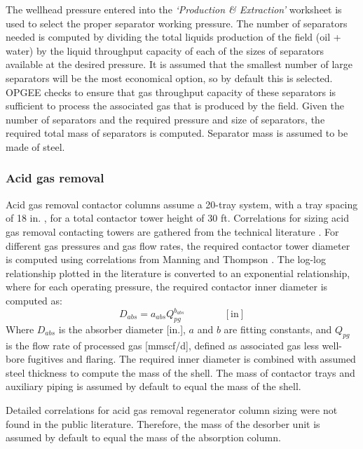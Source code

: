 \documentclass[11pt]{report}
\newcommand{\sheet}[1]{\textit{`{#1}'}}
\newcommand{\eqnunit}[1]{\quad\quad \scriptstyle{\left[\text{#1}\right]}}
\begin{document}
The wellhead pressure entered into the \sheet{Production \& Extraction} worksheet  is used to select the proper separator working pressure. The number of separators needed is computed by dividing the total liquids production of the field (oil + water) by the liquid throughput capacity of each of the sizes of separators available at the desired pressure.  It is assumed that the smallest number of large separators will be the most economical option, so by default this is selected. OPGEE checks to ensure that gas throughput capacity of these separators is sufficient to process the associated gas that is produced by the field.  Given the number of separators and the required pressure and size of separators, the required total mass of separators is computed. Separator mass is assumed to be made of steel.

\subsubsection{Acid gas removal}

Acid gas  removal contactor columns assume a 20-tray system, with a tray spacing of 18 in. \cite[p.116]{Manning1991}, for a total contactor tower height of 30 ft. Correlations for sizing acid gas removal contacting towers are gathered from the technical literature \cite{Manning1991}. For different gas pressures and gas flow rates, the required contactor tower diameter is  computed using correlations from Manning and Thompson \cite{Manning1991}. The log-log relationship plotted in the literature is converted to an exponential relationship, where for each operating pressure, the required contactor inner diameter is computed as:
\begin{equation}
D_{abs} = a_{abs} Q_{pg}^{b_{abs}} \quad\quad\eqnunit{in}
\end{equation}
Where $D_{abs}$ is the absorber diameter [in.], $a$ and $b$ are fitting constants, and $Q_{pg}$ is the flow rate of processed gas  [mmscf/d], defined as associated gas less well-bore fugitives and flaring. The required inner diameter is combined with assumed steel thickness  to compute the mass of the shell. The mass of contactor trays and auxiliary piping is assumed by default to equal the mass of the shell. 

Detailed correlations for acid gas removal regenerator column sizing were not found in the public literature. Therefore, the mass of the desorber unit is assumed by default to equal the mass of the absorption column.
\end{document}
